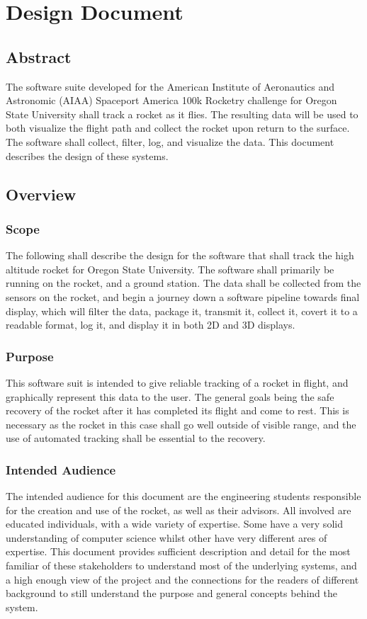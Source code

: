 \documentclass[onecolumn, draftclsnofoot,10pt, compsoc]{IEEEtran}
\begin{document}
\section {Design Document}
\subsection {Abstract}
The software suite developed for the American Institute of Aeronautics and Astronomic (AIAA) Spaceport America 100k Rocketry challenge for Oregon State University shall track a rocket as it flies. The resulting data will be used to both visualize the flight path and collect the rocket upon return to the surface. The software shall collect, filter, log, and visualize the data. This document describes the design of these systems.
\subsection {Overview}
\subsubsection {Scope}
The following shall describe the design for the software that shall track the high altitude rocket for Oregon State University. The software shall primarily be running on the rocket, and a ground station. The data shall be collected from the sensors on the rocket, and begin a journey down a software pipeline towards final display, which will filter the data, package it, transmit it, collect it, covert it to a readable format, log it, and display it in both 2D and 3D displays. 
\subsubsection {Purpose} 
This software suit is intended to give reliable tracking of a rocket in flight, and graphically represent this data to the user. The general goals being the safe recovery of the rocket after it has completed its flight and come to rest. This is necessary as the rocket in this case shall go well outside of visible range, and the use of automated tracking shall be essential to the recovery. 
\subsubsection {Intended Audience}
The intended audience for this document are the engineering students responsible for the creation and use of the rocket, as well as their advisors. All involved are educated individuals, with a wide variety of expertise. Some have a very solid understanding of computer science whilst other have very different ares of expertise. This document provides sufficient description and detail for the most familiar of these stakeholders to understand most of the underlying systems, and a high enough view of the project and the connections for the readers of different background to still understand the purpose and general concepts behind the system. 
\end{document}
